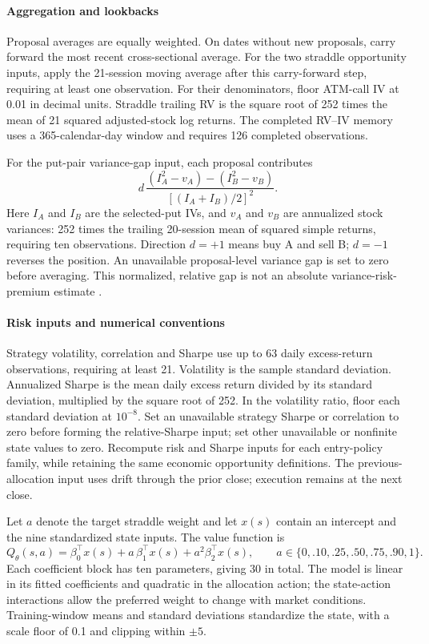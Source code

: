 \paragraph{Aggregation and lookbacks}
Proposal averages are equally weighted. On dates without new proposals, carry forward the most recent cross-sectional average. For the two straddle opportunity inputs, apply the 21-session moving average after this carry-forward step, requiring at least one observation. For their denominators, floor ATM-call IV at 0.01 in decimal units. Straddle trailing RV is the square root of 252 times the mean of 21 squared adjusted-stock log returns. The completed RV--IV memory uses a 365-calendar-day window and requires 126 completed observations.

For the put-pair variance-gap input, each proposal contributes
\begin{equation*}
d\,\frac{(I_A^2-v_A)-(I_B^2-v_B)}{[(I_A+I_B)/2]^2}.
\end{equation*}
Here \(I_A\) and \(I_B\) are the selected-put IVs, and \(v_A\) and \(v_B\) are annualized stock variances: 252 times the trailing 20-session mean of squared simple returns, requiring ten observations. Direction \(d=+1\) means buy A and sell B; \(d=-1\) reverses the position. An unavailable proposal-level variance gap is set to zero before averaging. This normalized, relative gap is not an absolute variance-risk-premium estimate \cite{carr2009variance}.

\paragraph{Risk inputs and numerical conventions}
Strategy volatility, correlation and Sharpe use up to 63 daily excess-return observations, requiring at least 21. Volatility is the sample standard deviation. Annualized Sharpe is the mean daily excess return divided by its standard deviation, multiplied by the square root of 252. In the volatility ratio, floor each standard deviation at \(10^{-8}\). Set an unavailable strategy Sharpe or correlation to zero before forming the relative-Sharpe input; set other unavailable or nonfinite state values to zero. Recompute risk and Sharpe inputs for each entry-policy family, while retaining the same economic opportunity definitions. The previous-allocation input uses drift through the prior close; execution remains at the next close.

Let \(a\) denote the target straddle weight and let \(x(s)\) contain an intercept and the nine standardized state inputs. The value function is
\begin{equation*}
Q_\theta(s,a)=\beta_0^\top x(s)+a\,\beta_1^\top x(s)
+a^2\beta_2^\top x(s),\qquad
a\in\{0,.10,.25,.50,.75,.90,1\}.
\end{equation*}
Each coefficient block has ten parameters, giving 30 in total. The model is linear in its fitted coefficients and quadratic in the allocation action; the state-action interactions allow the preferred weight to change with market conditions. Training-window means and standard deviations standardize the state, with a scale floor of 0.1 and clipping within \(\pm5\).

